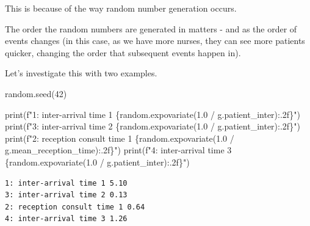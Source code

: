 \documentclass[
  letterpaper,
  DIV=11,
  numbers=noendperiod]{scrreprt}
\newenvironment{Shaded}{\begin{snugshade}}{\end{snugshade}}
\newcommand{\BuiltInTok}[1]{\textcolor[rgb]{0.00,0.23,0.31}{#1}}
\newcommand{\DecValTok}[1]{\textcolor[rgb]{0.68,0.00,0.00}{#1}}
\newcommand{\FloatTok}[1]{\textcolor[rgb]{0.68,0.00,0.00}{#1}}
\newcommand{\NormalTok}[1]{\textcolor[rgb]{0.00,0.23,0.31}{#1}}
\newcommand{\OperatorTok}[1]{\textcolor[rgb]{0.37,0.37,0.37}{#1}}
\newcommand{\SpecialCharTok}[1]{\textcolor[rgb]{0.37,0.37,0.37}{#1}}
\newcommand{\SpecialStringTok}[1]{\textcolor[rgb]{0.13,0.47,0.30}{#1}}
\begin{document}
\begin{tcolorbox}[enhanced jigsaw, rightrule=.15mm, colback=white, colframe=quarto-callout-note-color-frame, colbacktitle=quarto-callout-note-color!10!white, toprule=.15mm, coltitle=black, opacityback=0, titlerule=0mm, bottomtitle=1mm, breakable, title=\textcolor{quarto-callout-note-color}{\faInfo}\hspace{0.5em}{Note}, opacitybacktitle=0.6, toptitle=1mm, arc=.35mm, bottomrule=.15mm, leftrule=.75mm, left=2mm]

This is because of the way random number generation occurs.

The order the random numbers are generated in matters - and as the order
of events changes (in this case, as we have more nurses, they can see
more patients quicker, changing the order that subsequent events happen
in).

Let's investigate this with two examples.

\begin{Shaded}
\begin{Highlighting}[]
\NormalTok{random.seed(}\DecValTok{42}\NormalTok{)}

\BuiltInTok{print}\NormalTok{(}\SpecialStringTok{f"1: inter{-}arrival time 1 }\SpecialCharTok{\{}\NormalTok{random}\SpecialCharTok{.}\NormalTok{expovariate(}\FloatTok{1.0} \OperatorTok{/}\NormalTok{ g.patient\_inter)}\SpecialCharTok{:.2f\}}\SpecialStringTok{"}\NormalTok{)}
\BuiltInTok{print}\NormalTok{(}\SpecialStringTok{f"3: inter{-}arrival time 2 }\SpecialCharTok{\{}\NormalTok{random}\SpecialCharTok{.}\NormalTok{expovariate(}\FloatTok{1.0} \OperatorTok{/}\NormalTok{ g.patient\_inter)}\SpecialCharTok{:.2f\}}\SpecialStringTok{"}\NormalTok{)}
\BuiltInTok{print}\NormalTok{(}\SpecialStringTok{f"2: reception consult time 1 }\SpecialCharTok{\{}\NormalTok{random}\SpecialCharTok{.}\NormalTok{expovariate(}\FloatTok{1.0} \OperatorTok{/}\NormalTok{ g.mean\_reception\_time)}\SpecialCharTok{:.2f\}}\SpecialStringTok{"}\NormalTok{)}
\BuiltInTok{print}\NormalTok{(}\SpecialStringTok{f"4: inter{-}arrival time 3 }\SpecialCharTok{\{}\NormalTok{random}\SpecialCharTok{.}\NormalTok{expovariate(}\FloatTok{1.0} \OperatorTok{/}\NormalTok{ g.patient\_inter)}\SpecialCharTok{:.2f\}}\SpecialStringTok{"}\NormalTok{)}
\end{Highlighting}
\end{Shaded}

\begin{verbatim}
1: inter-arrival time 1 5.10
3: inter-arrival time 2 0.13
2: reception consult time 1 0.64
4: inter-arrival time 3 1.26
\end{verbatim}


\end{tcolorbox}
\end{document}
